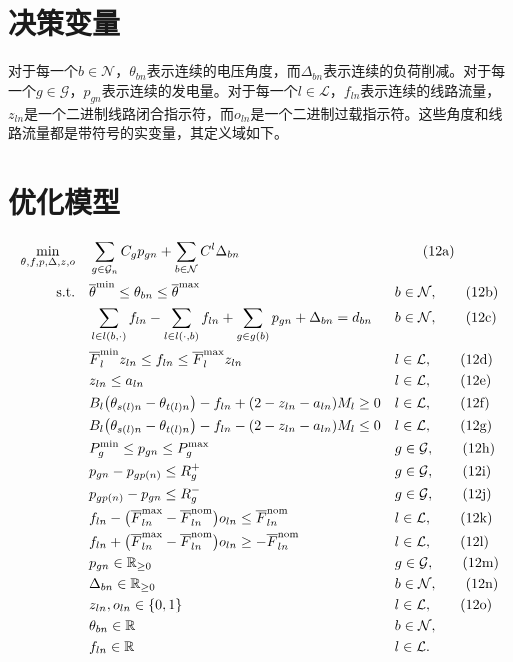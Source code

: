 \documentclass{article}
\begin{document}
\section*{决策变量}
对于每一个$b\in\mathcal N$，$\theta_{bn}$表示连续的电压角度，而$\Delta_{bn}$表示连续的负荷削减。对于每一个$g\in\mathcal G$，$p_{gn}$表示连续的发电量。对于每一个$l\in\mathcal L$，$f_{ln}$表示连续的线路流量，$z_{ln}$是一个二进制线路闭合指示符，而$o_{ln}$是一个二进制过载指示符。这些角度和线路流量都是带符号的实变量，其定义域如下。

\section*{优化模型}
\begin{align}
\min_{\theta,f,p,\Delta,z,o}\quad
 &\sum_{g\in\mathcal G_n}C_g p_{gn}
   +\sum_{b\in\mathcal N}C^l\Delta_{bn}
 &&\tag{12a}\\
\text{s.t.}\quad
 &\overline\theta^{\min}\leq\theta_{bn}\leq\overline\theta^{\max}
 && b\in\mathcal N,\tag{12b}\\
 &\sum_{l\in l(b,\cdot)}f_{ln}
  -\sum_{l\in l(\cdot,b)}f_{ln}
  +\sum_{g\in g(b)}p_{gn}+\Delta_{bn}=d_{bn}
 && b\in\mathcal N,\tag{12c}\\
 &\overline F_l^{\min}z_{ln}\leq f_{ln}\leq\overline F_l^{\max}z_{ln}
 && l\in\mathcal L,\tag{12d}\\
 &z_{ln}\leq a_{ln}
 && l\in\mathcal L,\tag{12e}\\
 &B_l\bigl(\theta_{s(l)n}-\theta_{t(l)n}\bigr)-f_{ln}
   +(2-z_{ln}-a_{ln})M_l\geq0
 && l\in\mathcal L,\tag{12f}\\
 &B_l\bigl(\theta_{s(l)n}-\theta_{t(l)n}\bigr)-f_{ln}
   -(2-z_{ln}-a_{ln})M_l\leq0
 && l\in\mathcal L,\tag{12g}\\
 &P_g^{\min}\leq p_{gn}\leq P_g^{\max}
 && g\in\mathcal G,\tag{12h}\\
 &p_{gn}-p_{g p(n)}\leq R_g^+
 && g\in\mathcal G,\tag{12i}\\
 &p_{g p(n)}-p_{gn}\leq R_g^-
 && g\in\mathcal G,\tag{12j}\\
 &f_{ln}-\bigl(\overline F_{ln}^{\max}-\overline F_{ln}^{\mathrm{nom}}\bigr)o_{ln}
   \leq\overline F_{ln}^{\mathrm{nom}}
 && l\in\mathcal L,\tag{12k}\\
 &f_{ln}+\bigl(\overline F_{ln}^{\max}-\overline F_{ln}^{\mathrm{nom}}\bigr)o_{ln}
   \geq-\overline F_{ln}^{\mathrm{nom}}
 && l\in\mathcal L,\tag{12l}\\
 &p_{gn}\in\mathbb R_{\geq0}
 && g\in\mathcal G,\tag{12m}\\
 &\Delta_{bn}\in\mathbb R_{\geq0}
 && b\in\mathcal N,\tag{12n}\\
 &z_{ln},o_{ln}\in\{0,1\}
 && l\in\mathcal L,\tag{12o}\\
 &\theta_{bn}\in\mathbb R
 && b\in\mathcal N,\notag\\
 &f_{ln}\in\mathbb R
 && l\in\mathcal L.\notag
\end{align}
\end{document}
